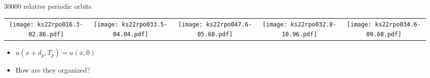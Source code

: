 \begin{frame}{30000 relative periodic orbits}
 \begin{center}
\begin{tabular}{ccccc} 
\texttt{[image: ks22rpo016.3-02.86.pdf]}\hspace{-3ex} &
\texttt{[image: ks22rpo033.5-04.04.pdf]}\hspace{-3ex} &
\texttt{[image: ks22rpo047.6-05.68.pdf]}\hspace{-3ex} &
 \texttt{[image: ks22rpo032.8-10.96.pdf]}\hspace{-3ex} &
 \texttt{[image: ks22rpo034.6-09.60.pdf]}\hspace{-3ex} 
\end{tabular}
\end{center}
\begin{block}{}
  \begin{itemize}
    \item $u(x+d_p,T_p)=u(x,0)$
    \item How are they organized?
  \end{itemize}
\end{block}

\end{frame}

